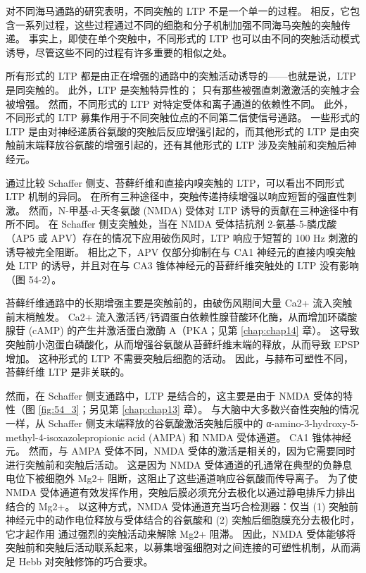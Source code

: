 对不同海马通路的研究表明，不同突触的 LTP 不是一个单一的过程。 相反，它包含一系列过程，这些过程通过不同的细胞和分子机制加强不同海马突触的突触传递。 事实上，即使在单个突触中，不同形式的 LTP 也可以由不同的突触活动模式诱导，尽管这些不同的过程有许多重要的相似之处。

所有形式的 LTP 都是由正在增强的通路中的突触活动诱导的——也就是说，LTP 是同突触的。 此外，LTP 是突触特异性的； 只有那些被强直刺激激活的突触才会被增强。 然而，不同形式的 LTP 对特定受体和离子通道的依赖性不同。 此外，不同形式的 LTP 募集作用于不同突触位点的不同第二信使信号通路。 一些形式的 LTP 是由对神经递质谷氨酸的突触后反应增强引起的，而其他形式的 LTP 是由突触前末端释放谷氨酸的增强引起的，还有其他形式的 LTP 涉及突触前和突触后神经元。

通过比较 Schaffer 侧支、苔藓纤维和直接内嗅突触的 LTP，可以看出不同形式 LTP 机制的异同。 在所有三种途径中，突触传递持续增强以响应短暂的强直性刺激。 然而，N-甲基-d-天冬氨酸 (NMDA) 受体对 LTP 诱导的贡献在三种途径中有所不同。 在 Schaffer 侧支突触处，当在 NMDA 受体拮抗剂 2-氨基-5-膦戊酸（AP5 或 APV）存在的情况下应用破伤风时，LTP 响应于短暂的 100 Hz 刺激的诱导被完全阻断。 相比之下，APV 仅部分抑制在与 CA1 神经元的直接内嗅突触处 LTP 的诱导，并且对在与 CA3 锥体神经元的苔藓纤维突触处的 LTP 没有影响（图 54-2）。

苔藓纤维通路中的长期增强主要是突触前的，由破伤风期间大量 Ca2+ 流入突触前末梢触发。 Ca2+ 流入激活钙/钙调蛋白依赖性腺苷酸环化酶，从而增加环磷酸腺苷 (cAMP) 的产生并激活蛋白激酶 A（PKA；见第 \ref{chap:chap14} 章）。 这导致突触前小泡蛋白磷酸化，从而增强谷氨酸从苔藓纤维末端的释放，从而导致 EPSP 增加。 这种形式的 LTP 不需要突触后细胞的活动。 因此，与赫布可塑性不同，苔藓纤维 LTP 是非关联的。

然而，在 Schaffer 侧支通路中，LTP 是结合的，这主要是由于 NMDA 受体的特性（图 \ref{fig:54_3}；另见第 \ref{chap:chap13} 章）。 与大脑中大多数兴奋性突触的情况一样，从 Schaffer 侧支末端释放的谷氨酸激活突触后膜中的 α-amino-3-hydroxy-5-methyl-4-isoxazolepropionic acid (AMPA) 和 NMDA 受体通道。 CA1 锥体神经元。 然而，与 AMPA 受体不同，NMDA 受体的激活是相关的，因为它需要同时进行突触前和突触后活动。 这是因为 NMDA 受体通道的孔通常在典型的负静息电位下被细胞外 Mg2+ 阻断，这阻止了这些通道响应谷氨酸而传导离子。 为了使 NMDA 受体通道有效发挥作用，突触后膜必须充分去极化以通过静电排斥力排出结合的 Mg2+。 以这种方式，NMDA 受体通道充当巧合检测器：仅当 (1) 突触前神经元中的动作电位释放与受体结合的谷氨酸和 (2) 突触后细胞膜充分去极化时，它才起作用 通过强烈的突触活动来解除 Mg2+ 阻滞。 因此，NMDA 受体能够将突触前和突触后活动联系起来，以募集增强细胞对之间连接的可塑性机制，从而满足 Hebb 对突触修饰的巧合要求。

